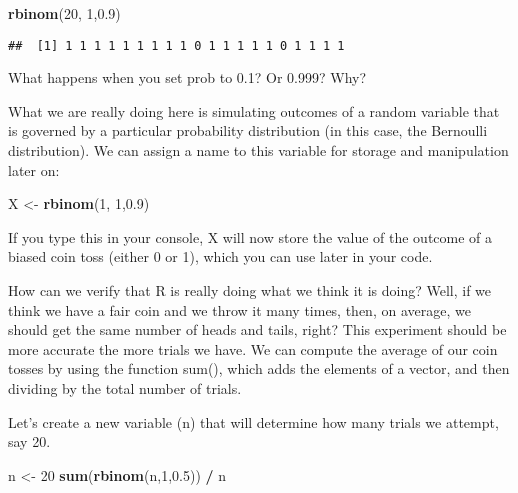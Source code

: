 \documentclass[
]{book}
\newenvironment{Shaded}{\begin{snugshade}}{\end{snugshade}}
\newcommand{\DecValTok}[1]{\textcolor[rgb]{0.00,0.00,0.81}{#1}}
\newcommand{\FloatTok}[1]{\textcolor[rgb]{0.00,0.00,0.81}{#1}}
\newcommand{\KeywordTok}[1]{\textcolor[rgb]{0.13,0.29,0.53}{\textbf{#1}}}
\newcommand{\NormalTok}[1]{#1}
\newcommand{\OperatorTok}[1]{\textcolor[rgb]{0.81,0.36,0.00}{\textbf{#1}}}
\newcommand{\StringTok}[1]{\textcolor[rgb]{0.31,0.60,0.02}{#1}}
\begin{document}
\begin{Shaded}
\begin{Highlighting}[]
\KeywordTok{rbinom}\NormalTok{(}\DecValTok{20}\NormalTok{, }\DecValTok{1}\NormalTok{,}\FloatTok{0.9}\NormalTok{)}
\end{Highlighting}
\end{Shaded}

\begin{verbatim}
##  [1] 1 1 1 1 1 1 1 1 1 0 1 1 1 1 1 0 1 1 1 1
\end{verbatim}

What happens when you set prob to 0.1? Or 0.999? Why?

What we are really doing here is simulating outcomes of a random variable that is governed by a particular probability distribution (in this case, the Bernoulli distribution). We can assign a name to this variable for storage and manipulation later on:

\begin{Shaded}
\begin{Highlighting}[]
\NormalTok{X \textless{}{-}}\StringTok{ }\KeywordTok{rbinom}\NormalTok{(}\DecValTok{1}\NormalTok{, }\DecValTok{1}\NormalTok{,}\FloatTok{0.9}\NormalTok{)}
\end{Highlighting}
\end{Shaded}

If you type this in your console, X will now store the value of the outcome of a biased coin toss (either 0 or 1), which you can use later in your code.

How can we verify that R is really doing what we think it is doing? Well, if we think we have a fair coin and we throw it many times, then, on average, we should get the same number of heads and tails, right? This experiment should be more accurate the more trials we have. We can compute the average of our coin tosses by using the function sum(), which adds the elements of a vector, and then dividing by the total number of trials.

Let's create a new variable (n) that will determine how many trials we attempt, say 20.

\begin{Shaded}
\begin{Highlighting}[]
\NormalTok{n \textless{}{-}}\StringTok{ }\DecValTok{20}
\KeywordTok{sum}\NormalTok{(}\KeywordTok{rbinom}\NormalTok{(n,}\DecValTok{1}\NormalTok{,}\FloatTok{0.5}\NormalTok{)) }\OperatorTok{/}\StringTok{ }\NormalTok{n}
\end{Highlighting}
\end{Shaded}
\end{document}
